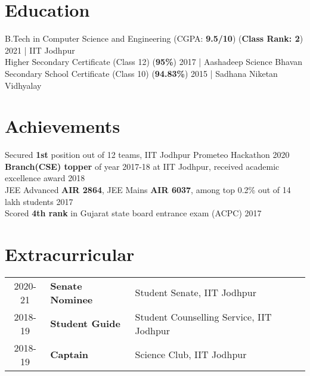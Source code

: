 \documentclass[a4paper]{single-column}
\begin{document}
\section{Education}
  B.Tech in Computer Science and Engineering (CGPA: \textbf{9.5/10}) (\textbf{Class Rank: 2})
  \hfill 2021 | IIT Jodhpur \\
  Higher Secondary Certificate (Class 12) (\textbf{95\%})
  \hfill 2017 | Aashadeep Science Bhavan \\
  Secondary School Certificate (Class 10) (\textbf{94.83\%})
  \hfill 2015 | Sadhana Niketan Vidhyalay \\

\sectionsep
\section{Achievements}
{Secured \textbf{1st} position out of 12 teams, IIT Jodhpur Prometeo Hackathon \hfill 2020}\\
{\textbf{Branch(CSE) topper} of year 2017-18 at IIT Jodhpur, received academic excellence award \hfill 2018}\\
{JEE Advanced \textbf{AIR 2864}, JEE Mains \textbf{AIR 6037}, among top 0.2\% out of 14 lakh students \hfill 2017}\\
{Scored \textbf{4th rank} in Gujarat state board entrance exam (ACPC) \hfill 2017}

\sectionsep
\section{Extracurricular}
\begin{tabular}{ c l l }
2020-21 & \textbf{Senate Nominee} & Student Senate, IIT Jodhpur \\  
2018-19 & \textbf{Student Guide} & Student Counselling Service, IIT Jodhpur \\
2018-19 & \textbf{Captain} & Science Club, IIT Jodhpur \\
\end{tabular}
\end{document}

